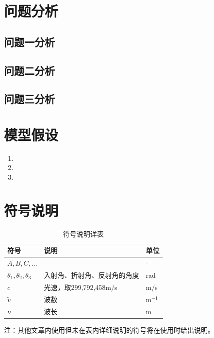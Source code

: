 \documentclass[withoutpreface,bwprint]{cumcmthesis} %
\begin{document}
\section{问题分析}

\subsection{问题一分析}

\subsection{问题二分析}

\subsection{问题三分析}

\section{模型假设}

\begin{enumerate}
    \item 
    \item 
    \item 
\end{enumerate}

\section{符号说明}

\begin{table}[H]
    \centering  %
    \caption{符号说明详表}  %
    \label{tab:符号说明}  %
    \begin{threeparttable}
        \begin{tabularx}{\textwidth}{p{} p{} l}
            \toprule[1.5pt]
            \textbf{符号} & \textbf{说明} & \textbf{单位} \\ 
            \midrule[1pt]
            $A, B, C, ...$ &  & - \\
            $\theta_1, \theta_2, \theta_3$ & 入射角、折射角、反射角的角度 & rad \\
            $c$ & 光速，取299,792,458m/s & m/s \\
            $\tilde{v} $ & 波数 & m$^{-1}$\\
            $\nu$ & 波长 & m\\
            \bottomrule[1.5pt]
        
        \end{tabularx}
        \begin{tablenotes}
            \footnotesize
            \item 注：其他文章内使用但未在表内详细说明的符号将在使用时给出说明。
        \end{tablenotes}
    \end{threeparttable}
\end{table}
\end{document}
